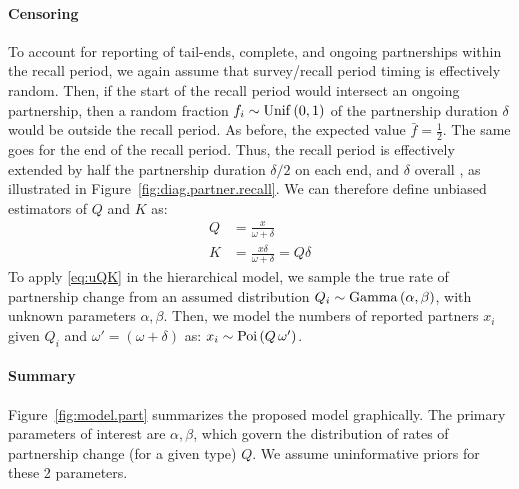\paragraph{Censoring}
To account for reporting of tail-ends, complete, and ongoing partnerships within the recall period,
we again assume that survey/recall period timing is effectively random.
Then, if the start of the recall period would intersect an ongoing partnership,
then a random fraction $f_i \sim \mathrm{Unif}\,(0,1)$ of the partnership duration $\delta$
would be outside the recall period.
As before, the expected value $\bar{f} = \frac12$.
The same goes for the end of the recall period.
Thus, the recall period is effectively extended by
half the partnership duration $\delta/2$ on each end, and $\delta$ overall \cite{Neely2023},
as illustrated in Figure~\ref{fig:diag.partner.recall}.
We can therefore define unbiased estimators of $Q$ and $K$ as:
\begin{subequations}\label{eq:uQK}
\begin{alignat}{1}
  Q &= \frac{x}{\omega + \delta}\\
  K &= \frac{x \delta}{\omega + \delta} = Q \delta
\end{alignat}
\end{subequations}
To apply \eqref{eq:uQK} in the hierarchical model, we sample the true rate of partnership change
from an assumed distribution $Q_i \sim \mathrm{Gamma}\,(\alpha,\beta)$,
with unknown parameters $\alpha, \beta$.
Then, we model the numbers of reported partners $x_i$
given $Q_i$ and $\omega' = (\omega + \delta)$ as: $x_i \sim \mathrm{Poi}\,(Q\,\omega')$.
\paragraph{Summary}
Figure~\ref{fig:model.part} summarizes the proposed model graphically.
The primary parameters of interest are $\alpha, \beta$, which govern
the distribution of rates of partnership change (for a given type) $Q$.
We assume uninformative priors for these 2 parameters.
